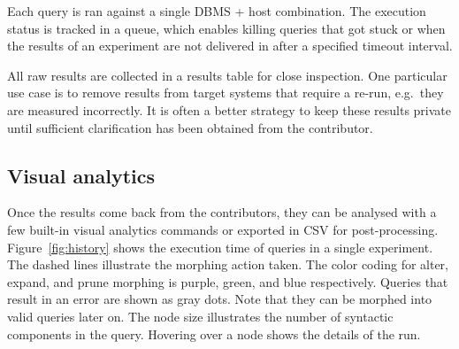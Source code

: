 \documentclass{cidr-2019}
\begin{document}
Each query is ran against a single DBMS + host combination. The
execution status is tracked in a queue, which enables killing queries
that got stuck or when the results of an experiment are not delivered
in after a specified timeout interval.

All raw results are collected in a results table for close
inspection. One particular use case is to remove results from target
systems that require a re-run, e.g.\ they are measured incorrectly. It
is often a better strategy to keep these results private until
sufficient clarification has been obtained from the contributor.

\subsection{Visual analytics}

Once the results come back from the contributors, they can be analysed
with a few built-in visual analytics commands or exported in CSV for
post-processing. Figure~\ref{fig:history} shows the execution time of
queries in a single experiment. The dashed lines illustrate the
morphing action taken. The color coding for alter, expand, and prune
morphing is purple, green, and blue respectively. Queries that result
in an error are shown as gray dots. Note that they can be morphed into
valid queries later on. The node size illustrates the number of
syntactic components in the query. Hovering over a
node shows the details of the run.
\end{document}
